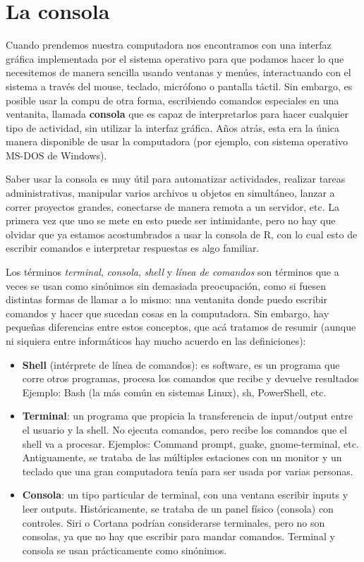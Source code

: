 \documentclass[
]{book}
\providecommand{\tightlist}{%
  \setlength{\itemsep}{0pt}\setlength{\parskip}{0pt}}
\begin{document}
\hypertarget{la-consola}{%
\section{La consola}\label{la-consola}}

Cuando prendemos nuestra computadora nos encontramos con una interfaz gráfica implementada por el sistema operativo para que podamos hacer lo que necesitemos de manera sencilla usando ventanas y menúes, interactuando con el sistema a través del mouse, teclado, micrófono o pantalla táctil. Sin embargo, es posible usar la compu de otra forma, escribiendo comandos especiales en una ventanita, llamada \textbf{consola} que es capaz de interpretarlos para hacer cualquier tipo de actividad, sin utilizar la interfaz gráfica. Años atrás, esta era la única manera disponible de usar la computadora (por ejemplo, con sistema operativo MS-DOS de Windows).

Saber usar la consola es muy útil para automatizar actividades, realizar tareas administrativas, manipular varios archivos u objetos en simultáneo, lanzar a correr proyectos grandes, conectarse de manera remota a un servidor, etc. La primera vez que uno se mete en esto puede ser intimidante, pero no hay que olvidar que ya estamos acostumbrados a usar la consola de R, con lo cual esto de escribir comandos e interpretar respuestas es algo familiar.

Los términos \emph{terminal}, \emph{consola}, \emph{shell} y \emph{línea de comandos} son términos que a veces se usan como sinónimos sin demasiada preocupación, como si fuesen distintas formas de llamar a lo mismo: una ventanita donde puedo escribir comandos y hacer que sucedan cosas en la computadora. Sin embargo, hay pequeñas diferencias entre estos conceptos, que acá tratamos de resumir (aunque ni siquiera entre informáticos hay mucho acuerdo en las definiciones):

\begin{itemize}
\tightlist
\item
  \textbf{Shell} (intérprete de línea de comandos): es software, es un programa que corre otros programas, procesa los comandos que recibe y devuelve resultados Ejemplo: Bash (la más común en sistemas Linux), sh, PowerShell, etc.
\item
  \textbf{Terminal}: un programa que propicia la transferencia de input/output entre el usuario y la shell. No ejecuta comandos, pero recibe los comandos que el shell va a procesar. Ejemplos: Command prompt, guake, gnome-terminal, etc. Antiguamente, se trataba de las múltiples estaciones con un monitor y un teclado que una gran computadora tenía para ser usada por varias personas.
\item
  \textbf{Consola}: un tipo particular de terminal, con una ventana escribir inputs y leer outputs. Históricamente, se trataba de un panel físico (consola) con controles. Siri o Cortana podrían considerarse terminales, pero no son consolas, ya que no hay que escribir para mandar comandos. Terminal y consola se usan prácticamente como sinónimos.
\end{itemize}
\end{document}
